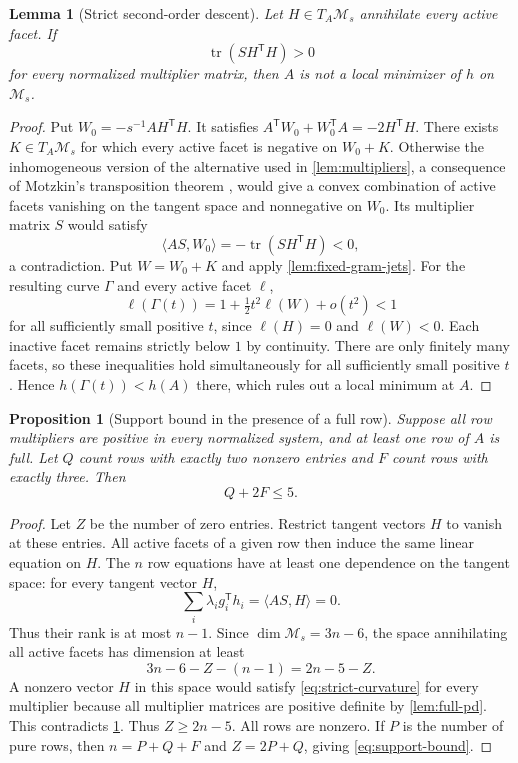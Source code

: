 \documentclass[11pt]{article}
\numberwithin{equation}{section}
\newtheorem{proposition}[proposition]{Proposition}
\newtheorem{lemma}[lemma]{Lemma}
\theoremstyle{definition}
\theoremstyle{definition}
\DeclareMathOperator{\tr}{tr}
\begin{document}
\begin{lemma}[Strict second-order descent]\label{lem:second-order}
Let $H\in T_A\mathcal M_s$ annihilate every active facet.
If
\begin{equation}\label{eq:strict-curvature}
 \tr(SH^{\mathsf T}H)>0
\end{equation}
for every normalized multiplier matrix, then $A$ is not a local minimizer
of $h$ on $\mathcal M_s$.
\end{lemma}
\begin{proof}
Put $W_0=-s^{-1}AH^{\mathsf T}H$. It satisfies
$A^{\mathsf T}W_0+W_0^{\mathsf T}A=-2H^{\mathsf T}H$.
There exists $K\in T_A\mathcal M_s$ for which every active facet is
negative on $W_0+K$. Otherwise the inhomogeneous version of the
alternative used in \cref{lem:multipliers}, a consequence of Motzkin's
transposition theorem \cite[Ch.~7]{Schrijver1986}, would give
a convex combination of active facets vanishing on the tangent space
and nonnegative on $W_0$. Its multiplier matrix $S$ would satisfy
\[
 \langle AS,W_0\rangle=-\tr(SH^{\mathsf T}H)<0,
\]
a contradiction. Put $W=W_0+K$ and apply
\cref{lem:fixed-gram-jets}. For the resulting curve $\Gamma$ and every
active facet $\ell$,
\[
 \ell(\Gamma(t))
 =1+\tfrac12t^2\ell(W)+o(t^2)<1
\]
for all sufficiently small positive $t$, since $\ell(H)=0$ and
$\ell(W)<0$. Each inactive facet remains strictly below $1$ by
continuity. There are only finitely many facets, so these inequalities
hold simultaneously for all sufficiently small positive $t$. Hence
$h(\Gamma(t))<h(A)$ there, which rules out a local minimum at $A$.
\end{proof}

\begin{proposition}[Support bound in the presence of a full row]
\label{prop:support-bound}
Suppose all row multipliers are positive in every normalized system,
and at least one row of $A$ is full. Let $Q$ count rows with exactly two
nonzero entries and $F$ count rows with exactly three. Then
\begin{equation}\label{eq:support-bound}
 Q+2F\le5.
\end{equation}
\end{proposition}
\begin{proof}
Let $Z$ be the number of zero entries. Restrict tangent vectors $H$ to
vanish at these entries. All active facets of a given row then induce
the same linear equation on $H$. The $n$ row equations have at least
one dependence on the tangent space: for every tangent vector $H$,
\[
 \sum_i\lambda_i g_i^{\mathsf T}h_i
 =\langle AS,H\rangle=0.
\]
Thus their rank is at most $n-1$.  Since
$\dim\mathcal M_s=3n-6$, the space annihilating all active facets
has dimension at least
\[
 3n-6-Z-(n-1)=2n-5-Z.
\]
A nonzero vector $H$ in this space would satisfy
\eqref{eq:strict-curvature} for every multiplier because
all multiplier matrices are positive definite by
\cref{lem:full-pd}. This contradicts \cref{lem:second-order}.
Thus $Z\ge2n-5$. All rows are nonzero. If $P$ is the number of pure
rows, then $n=P+Q+F$ and $Z=2P+Q$, giving \eqref{eq:support-bound}.
\end{proof}
\end{document}
